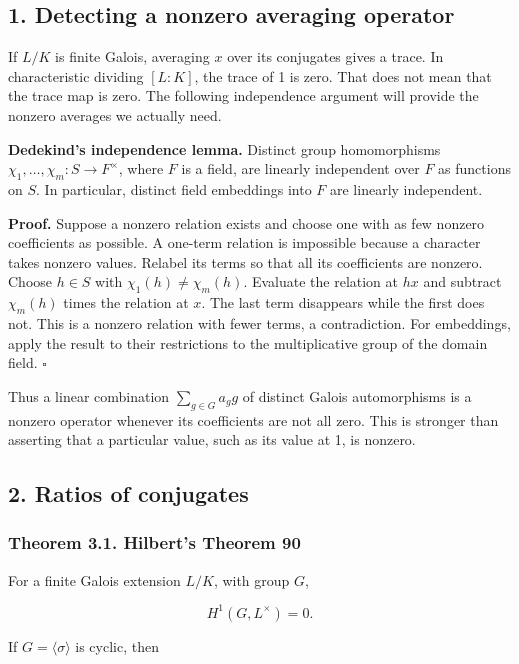 \documentclass[11pt,a4paper]{article}
\begin{document}
\subsection{1. Detecting a nonzero averaging
operator}\label{detecting-a-nonzero-averaging-operator}

If \(L/K\) is finite Galois, averaging \(x\) over its conjugates gives a
trace. In characteristic dividing \([L:K]\), the trace of 1 is zero.
That does not mean that the trace map is zero. The following
independence argument will provide the nonzero averages we actually
need.

\textbf{Dedekind's independence lemma.} Distinct group homomorphisms
\(\chi_1,\ldots,\chi_m:S\to F^\times\), where \(F\) is a field, are
linearly independent over \(F\) as functions on \(S\). In particular,
distinct field embeddings into \(F\) are linearly independent.

\textbf{Proof.} Suppose a nonzero relation exists and choose one with as
few nonzero coefficients as possible. A one-term relation is impossible
because a character takes nonzero values. Relabel its terms so that all
its coefficients are nonzero. Choose \(h\in S\) with
\(\chi_1(h)\ne\chi_m(h)\). Evaluate the relation at \(hx\) and subtract
\(\chi_m(h)\) times the relation at \(x\). The last term disappears
while the first does not. This is a nonzero relation with fewer terms, a
contradiction. For embeddings, apply the result to their restrictions to
the multiplicative group of the domain field. \(\square\)

Thus a linear combination \(\sum_{g\in G}a_g g\) of distinct Galois
automorphisms is a nonzero operator whenever its coefficients are not
all zero. This is stronger than asserting that a particular value, such
as its value at 1, is nonzero.

\subsection{2. Ratios of conjugates}\label{ratios-of-conjugates}

\subsubsection{Theorem 3.1. Hilbert's Theorem
90}\label{theorem-3.1.-hilberts-theorem-90}

For a finite Galois extension \(L/K\), with group \(G\),

\[
H^1(G,L^\times)=0.
\]

If \(G=\langle\sigma\rangle\) is cyclic, then
\end{document}
